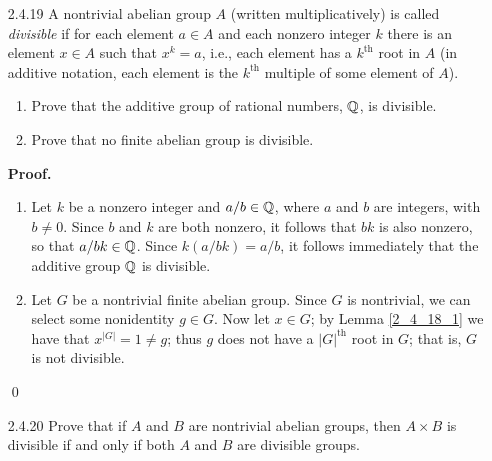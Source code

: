 \begin{enumerate}
\begin{enumerate}
               positive integer $k$. By (b), we have that $H_k \le H_{k+1}$.
               Note that $|H_{k+1}| = p^{k+1}$, so that $H_{k+1} \neq Z$, since
               $Z$ is infinite. Thus a proper subgroup of $Z$---not equal to
               $H$---contains $H$, contradicting the maximality of $H$. Thus $Z$
               is not finitely generated.
      \end{enumerate} \qed
   \item[2.4.19]  A nontrivial abelian group $A$ (written multiplicatively) is
                  called \textit{divisible} if for each element $a \in A$ and
                  each nonzero integer $k$ there is an element $x \in A$ such
                  that $x^k = a$, i.e., each element has a $k^{\text{th}}$ root
                  in $A$ (in additive notation, each element is the
                  $k^{\text{th}}$ multiple of some element of $A$).
                  \begin{enumerate}
                     \item Prove that the additive group of rational numbers,
                           $\mathbb{Q}$, is divisible.
                     \item Prove that no finite abelian group is divisible.
                  \end{enumerate}
                  
      \textbf{Proof.}
      
      \begin{enumerate}
         \item Let $k$ be a nonzero integer and $a/b \in \mathbb{Q}$, where $a$ and $b$
               are integers, with $b \neq 0$. Since $b$ and $k$ are both
               nonzero, it follows that $bk$ is also nonzero, so that
               $a/bk \in \mathbb{Q}$. Since $k(a/bk) = a/b$, it follows immediately that
               the additive group $\mathbb{Q}$ is divisible.
         \item Let $G$ be a nontrivial finite abelian group. Since $G$ is
               nontrivial, we can select some nonidentity $g \in G$. Now let
               $x \in G$; by Lemma \ref{2_4_18_1} we have that
               $x^{|G|} = 1 \neq g$; thus $g$ does not have a $|G|^{\text{th}}$
               root in $G$; that is, $G$ is not divisible. 
      \end{enumerate} \qed
   \item[2.4.20]  Prove that if $A$ and $B$ are nontrivial abelian groups, then
                  $A \times B$ is divisible if and only if both $A$ and $B$ are
                  divisible groups.
                  

\end{enumerate}
